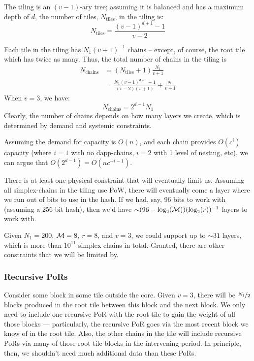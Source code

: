 The tiling is an $(v-1)$-ary tree; assuming it is balanced and has a maximum depth of $d$, the number of tiles, $N_{\text{tiles}}$, in the tiling is:
\begin{equation}
    N_{\text{tiles}} = \frac{(v-1)^{d+1} - 1}{v - 2}
\end{equation}

Each tile in the tiling has $N_1 (v + 1)^{-1}$ chains -- except, of course, the root tile which has twice as many.
Thus, the total number of chains in the tiling is
\begin{align*}
    N_{\text{chains}} & = (N_{\text{tiles}} + 1) \frac{N_1}{v + 1} \\
    & = \frac{N_1 (v-1)^{d+1} - 1}{(v - 2)(v + 1)} + \frac{N_1}{v + 1}
\end{align*}
When $v = 3$, we have:
\begin{equation}
    N_{\text{chains}} = 2^{d-1} N_1
\end{equation}
Clearly, the number of chains depends on how many layers we create, which is determined by demand and systemic constraints.

Assuming the demand for capacity is $O(n)$, and each chain provides $O(c^i)$ capacity (where $i=1$ with no dapp-chains, $i=2$ with 1 level of nesting, etc), we can argue that $O(2^{d-1}) = O(n c^{-i-1})$.

There is at least one physical constraint that will eventually limit us.
Assuming all simplex-chains in the tiling use PoW, there will eventually come a layer where we run out of bits to use in the hash.
If we had, say, 96 bits to work with (assuming a 256 bit hash), then we'd have $\sim (96 - \log_2(\Mroot)) (\log_2(r))^{-1}$ layers to work with.

Given $N_1 = 200$, $\mathcal{M} = 8$, $r = 8$, and $v = 3$, we could support up to $\sim 31$ layers, which is more than $10^{11}$ simplex-chains in total.
Granted, there are other constraints that we will be limited by.

\subsubsection{Recursive PoRs}

Consider some block in some tile outside the core.
Given $v=3$, there will be $\nicefrac{N_1}{2}$ blocks produced in the root tile between this block and the next block.
We only need to include one recursive PoR with the root tile to gain the weight of all those blocks --- particularly, the recursive PoR goes via the most recent block we know of in the root tile.
Also, the other chains in the tile will include recursive PoRs via many of those root tile blocks in the intervening period.
In principle, then, we shouldn't need much additional data than these PoRs.

